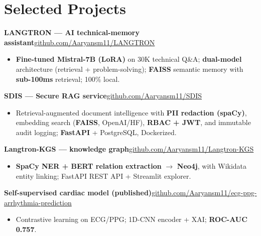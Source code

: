 \documentclass[10pt,a4paper]{article}
\begin{document}
\section*{Selected Projects}
\vspace{1pt}\textbf{LANGTRON --- AI technical-memory assistant}\hfill {\small\href{https://github.com/Aaryansm11/LANGTRON}{github.com/Aaryansm11/LANGTRON}}
\begin{itemize}
\item \textbf{Fine-tuned Mistral-7B (LoRA)} on 30K technical Q\&A; \textbf{dual-model} architecture (retrieval + problem-solving); \textbf{FAISS} semantic memory with \textbf{sub-100ms} retrieval; 100\% local.
\end{itemize}
\vspace{1pt}\textbf{SDIS --- Secure RAG service}\hfill {\small\href{https://github.com/Aaryansm11/SDIS}{github.com/Aaryansm11/SDIS}}
\begin{itemize}
\item Retrieval-augmented document intelligence with \textbf{PII redaction (spaCy)}, embedding search (\textbf{FAISS}, OpenAI/HF), \textbf{RBAC + JWT}, and immutable audit logging; \textbf{FastAPI} + PostgreSQL, Dockerized.
\end{itemize}
\vspace{1pt}\textbf{Langtron-KGS --- knowledge graph}\hfill {\small\href{https://github.com/Aaryansm11/Langtron-KGS}{github.com/Aaryansm11/Langtron-KGS}}
\begin{itemize}
\item \textbf{SpaCy NER + BERT relation extraction} $\rightarrow$ \textbf{Neo4j}, with Wikidata entity linking; FastAPI REST API + Streamlit explorer.
\end{itemize}
\vspace{1pt}\textbf{Self-supervised cardiac model (published)}\hfill {\small\href{https://github.com/Aaryansm11/ecg-ppg-arrhythmia-prediction}{github.com/Aaryansm11/ecg-ppg-arrhythmia-prediction}}
\begin{itemize}
\item Contrastive learning on ECG/PPG; 1D-CNN encoder + XAI; \textbf{ROC-AUC 0.757}.
\end{itemize}
\end{document}
